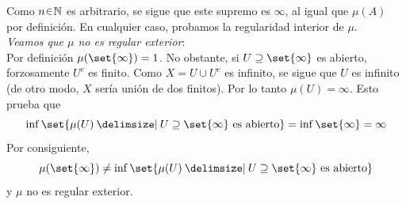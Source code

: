 \begin{sol}
\begin{enumerate}[label = (\roman*), leftmargin=1.5em]
\[\]
Como $n\en\mathbb{N}$ es arbitrario, se sigue que este supremo es $\infty$, al igual que $\mu(A)$ por definición. En cualquier caso, probamos la regularidad interior de $\mu$.\vspace{1em}\\
\emph{Veamos que $\mu$ no es regular exterior}:\\
Por definición $\mu(\set{\infty}) = 1$. No obstante, si $U \supseteq \set{\infty}$ es abierto, forzosamente $U^c$ es finito. Como $X = U \cup U^c$ es infinito, se sigue que $U$ es infinito (de otro modo, $X$ sería unión de dos finitos). Por lo tanto $\mu(U) = \infty$. Esto prueba que
\[
\inf\set{\mu(U) \given U \supseteq \set{\infty} \text{ es abierto}}
= \inf\set{\infty} = \infty
\]
Por consiguiente,
\[
\mu(\set{\infty}) \neq \inf\set{\mu(U) \given U \supseteq \set{\infty} \text{ es abierto}}
\]
y $\mu$ no es regular exterior.
\end{enumerate}
\end{sol}
